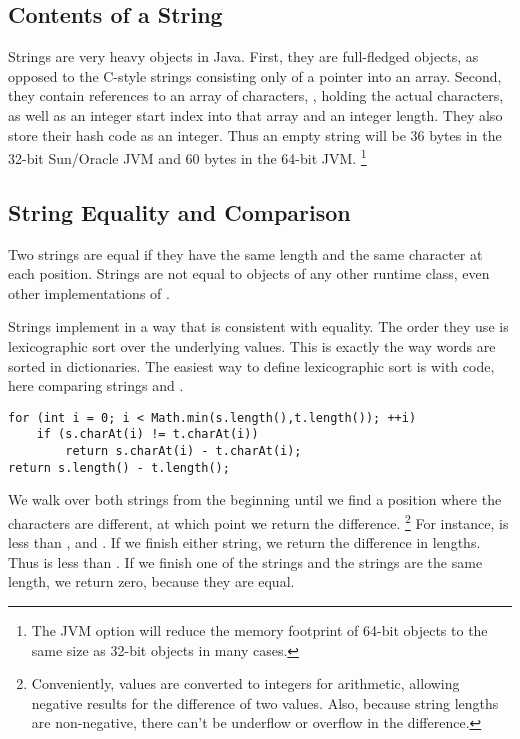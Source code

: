 \subsection{Contents of a String}

Strings are very heavy objects in Java.  First, they are full-fledged
objects, as opposed to the C-style strings consisting only of a
pointer into an array.  Second, they contain references to an array of
characters, , holding the actual characters, as well as
an integer start index into that array and an integer length.  They
also store their hash code as an integer.  Thus an empty string will
be 36 bytes in the 32-bit Sun/Oracle JVM and 60 bytes in the 64-bit
JVM.%
%
\footnote{The JVM option  will reduce
the memory footprint of 64-bit objects to the same size as 32-bit
objects in many cases.}


\subsection{String Equality and Comparison}

Two strings are equal if they have the same length and the same
character at each position.  Strings are not equal to objects of any
other runtime class, even other implementations of .

Strings implement  in a way that is
consistent with equality.  The order they use is lexicographic
sort over the underlying  values.  This is exactly the
way words are sorted in dictionaries.  The easiest way to define
lexicographic sort is with code, here comparing strings 
and .
%
\begin{verbatim}
for (int i = 0; i < Math.min(s.length(),t.length()); ++i)
    if (s.charAt(i) != t.charAt(i))
        return s.charAt(i) - t.charAt(i);
return s.length() - t.length();
\end{verbatim}

We walk over both strings from the beginning until we find a position
where the characters are different, at which point we return the
difference.%
%
\footnote{Conveniently,  values are converted to integers
  for arithmetic, allowing negative results for the difference of two
  values.  Also, because string lengths are non-negative, there can't
  be underflow or overflow in the difference.}
%
For instance,  is less than 
, and .  If we finish either string, we
return the difference in lengths.  Thus  is less than
.  If we finish one of the strings and the strings are
the same length, we return zero, because they are equal.

